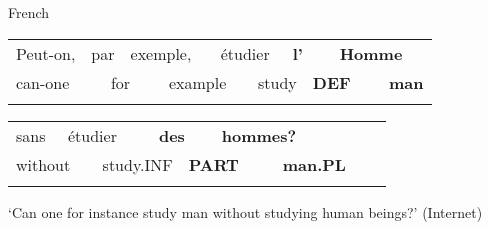 \begin{listWWNumileveli}
\item 

\begin{styleExample}
French

\end{styleExample}

\end{listWWNumileveli}

\begin{tabular}{llllllllllll}
\lsptoprule
Peut-on, & \multicolumn{2}{l}{par

} & \multicolumn{2}{l}{exemple,

} & \multicolumn{2}{l}{étudier

} & \multicolumn{2}{l}{{\bfseries l’}

} & \multicolumn{2}{l}{{\bfseries  Homme}

} & \\
\multicolumn{2}{l}{can-one

} & \multicolumn{2}{l}{for

} & \multicolumn{2}{l}{example

} & \multicolumn{2}{l}{study

} & \multicolumn{2}{l}{{\bfseries DEF }

} & \multicolumn{2}{l}{{\bfseries man}

}\\
\lspbottomrule
\end{tabular}

\begin{tabular}{llllllllll}
\lsptoprule
sans & \multicolumn{2}{l}{étudier

} & \multicolumn{2}{l}{{\bfseries des}

} & \multicolumn{2}{l}{{\bfseries hommes?}

} & \multicolumn{2}{l}{} & \\
\multicolumn{2}{l}{without

} & \multicolumn{2}{l}{study.INF

} & \multicolumn{2}{l}{{\bfseries PART}

} & \multicolumn{2}{l}{{\bfseries man.PL}

} & \multicolumn{2}{l}{}\\
\lspbottomrule
\end{tabular}

\begin{styleTranslation}
‘Can one for instance study man without studying human beings?’ (Internet)

\end{styleTranslation}


